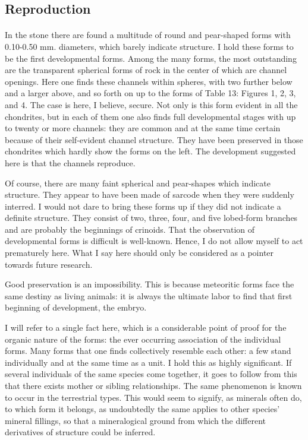 \documentclass[a4paper, 12pt, oneside]{article}
\begin{document}
\subsection{Reproduction}
\paragraph{}
In the stone there are found a multitude of round and pear-shaped forms with 0.10-0.50 mm. diameters, which barely indicate structure. I hold these forms to be the first developmental forms. Among the many forms, the most outstanding are the transparent spherical forms of rock in the center of which are channel openings. Here one finds these channels within spheres, with two further below and a larger above, and so forth on up to the forms of Table 13: Figures 1, 2, 3, and 4. The case is here, I believe, secure. Not only is this form evident in all the chondrites, but in each of them one also finds full developmental stages with up to twenty or more channels: they are common and at the same time certain because of their self-evident channel structure. They have been preserved in those chondrites which hardly show the forms on the left. The development suggested here is that the channels reproduce.

Of course, there are many faint spherical and pear-shapes which indicate structure. They appear to have been made of sarcode when they were suddenly interred. I would not dare to bring these forms up if they did not indicate a definite structure. They consist of two, three, four, and five lobed-form branches and are probably the beginnings of crinoids. That the observation of developmental forms is difficult is well-known. Hence, I do not allow myself to act prematurely here. What I say here should only be considered as a pointer towards future research.

Good preservation is an impossibility. This is because meteoritic forms face the same destiny as living animals: it is always the ultimate labor to find that first beginning of development, the embryo.

I will refer to a single fact here, which is a considerable point of proof for the organic nature of the forms: the ever occurring association of the individual forms. Many forms that one finds collectively resemble each other: a few stand individually and at the same time as a unit. I hold this as highly significant. If several individuals of the same species come together, it goes to follow from this that there exists mother or sibling relationships. The same phenomenon is known to occur in the terrestrial types. This would seem to signify, as minerals often do, to which form it belongs, as undoubtedly the same applies to other species' mineral fillings, so that a mineralogical ground from which the different derivatives of structure could be inferred.
\clearpage
\end{document}
